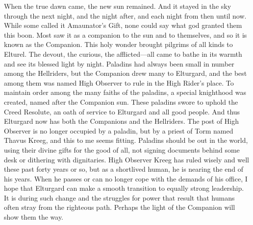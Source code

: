 \documentclass[10pt,a4paper,twoside,twocolumn,openany,bg=print,nodeprecatedcode]{dndbook}
\begin{document}
When the true dawn came, the new sun remained. And it stayed in the sky through the next night, and the night after, and each night from then until now. While some called it Amaunator's Gift, none could say what god granted them this boon. Most saw it as a companion to the sun and to themselves, and so it is known as the Companion. This holy wonder brought pilgrims of all kinds to Elturel. The devout, the curious, the afflicted—all came to bathe in its warmth and see its blessed light by night. Paladins had always been small in number among the Hellriders, but the Companion drew many to Elturgard, and the best among them was named High Observer to rule in the High Rider's place.
To maintain order among the many faiths of the paladins, a special knighthood was created, named after the Companion sun. These paladins swore to uphold the Creed Resolute, an oath of service to Elturgard and all good people. And thus Elturgard now has both the Companions and the Hellriders.
The post of High Observer is no longer occupied by a paladin, but by a priest of Torm named Thavus Kreeg, and this to me seems fitting. Paladins should be out in the world, using their divine gifts for the good of all, not signing documents behind some desk or dithering with dignitaries. High Observer Kreeg has ruled wisely and well these past forty years or so, but as a shortlived human, he is nearing the end of his years. When he passes or can no longer cope with the demands of his office, I hope that Elturgard can make a smooth transition to equally strong leadership. It is during such change and the struggles for power that result that humans often stray from the righteous path. Perhaps the light of the Companion will show them the way.
\end{document}
